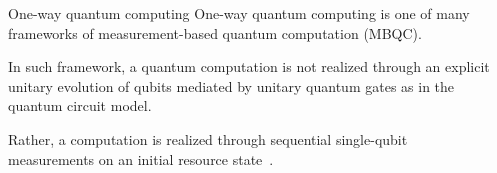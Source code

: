 \documentclass[final]{beamer}
\newlength{\sepwidth}
\newlength{\colwidth}
\newcommand{\separatorcolumn}{\begin{column}{\sepwidth}\end{column}}
\begin{document}
    \begin{frame}[t]
        \begin{columns}[t]
            \separatorcolumn

            \begin{column}{\colwidth}
                \begin{block}{One-way quantum computing}
                    One-way quantum computing is one of many frameworks of
                    measurement-based quantum computation (MBQC).

                    In such framework, a quantum computation is not realized
                    through an explicit unitary evolution of qubits mediated by unitary quantum gates as in the
                    quantum circuit model.

                    Rather, a computation is realized through sequential single-qubit
                    measurements on an initial resource
                    state~\cite{PhysRevA.68.022312}.

                    \begin{figure}[H]
                        \centering
\end{figure}
\end{block}
\end{column}
\end{columns}
\end{frame}
\end{document}
